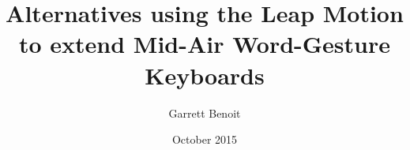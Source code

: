 \documentclass
[
]
{thesis}
\title{Alternatives using the Leap Motion to extend Mid-Air Word-Gesture Keyboards}
\author{Garrett Benoit}
\date{October 2015}
\begin{document}
	
	
	
	
	
	
	
	\thesisAppendixPage 
	\begin{appendices}
		
		
	\end{appendices}
	
	
	
\end{document}
